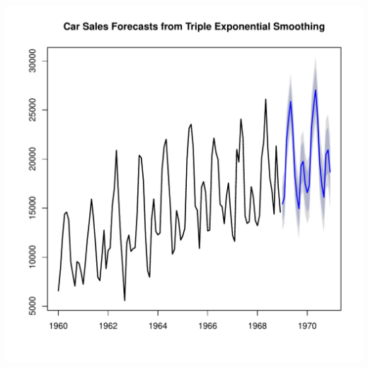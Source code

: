 \documentclass[10pt]{article}\usepackage[]{graphicx}\usepackage[]{color}
\makeatletter
\def\maxwidth{ %
  \ifdim\Gin@nat@width>\linewidth
    \linewidth
  \else
    \Gin@nat@width
  \fi
}
\newenvironment{knitrout}{}{} %
\makeatother
\begin{document}
\begin{knitrout}
\includegraphics[width=\maxwidth]{figure/unnamed-chunk-39-1} 

\end{knitrout}
\end{document}

